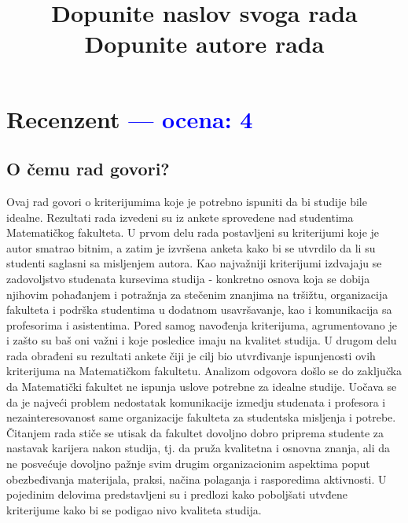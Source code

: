 \documentclass[a4paper]{report}
\newcommand{\odgovor}[1]{\textcolor{blue}{#1}}
\begin{document}
 
 \title{Dopunite naslov svoga rada\\ \small{Dopunite autore rada}}
 
 \maketitle
 
 \tableofcontents
 

 \chapter{Recenzent \odgovor{--- ocena: 4} }
 
 
 \section{O čemu rad govori?}
 Ovaj rad govori o kriterijumima koje je potrebno ispuniti da bi studije bile idealne. Rezultati rada izvedeni su iz ankete sprovedene nad studentima Matematičkog fakulteta. U prvom delu rada postavljeni su kriterijumi koje je autor smatrao bitnim, a zatim je izvršena anketa kako bi se utvrdilo da li su studenti saglasni sa misljenjem autora. Kao najvažniji kriterijumi izdvajaju se zadovoljstvo studenata kursevima studija - konkretno osnova koja se dobija njihovim pohađanjem i potražnja za stečenim znanjima na tršižtu, organizacija fakulteta i podrška studentima u dodatnom usavršavanje, kao i komunikacija sa profesorima i asistentima. Pored samog navođenja kriterijuma, agrumentovano je i zašto su baš oni važni i koje posledice imaju na kvalitet studija. U drugom delu rada obrađeni su rezultati ankete čiji je cilj bio utvrđivanje ispunjenosti ovih kriterijuma na Matematičkom fakultetu. Analizom odgovora došlo se do zaključka da Matematički fakultet ne ispunja uslove potrebne za idealne studije. Uočava se da je najveći problem nedostatak komunikacije izmedju studenata i profesora i nezainteresovanost same organizacije fakulteta za studentska misljenja i potrebe. Čitanjem rada stiče se utisak da fakultet dovoljno dobro priprema studente za nastavak karijera nakon studija, tj. da pruža kvalitetna i osnovna znanja, ali da ne posvećuje dovoljno pažnje svim drugim organizacionim aspektima poput obezbeđivanja materijala, praksi, načina polaganja i rasporedima aktivnosti. U pojedinim delovima predstavljeni su i predlozi kako poboljšati utvđene kriterijume kako bi se podigao nivo kvaliteta studija.
 
\end{document}
